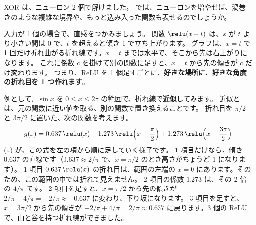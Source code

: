 XOR は、ニューロン 2 個で解けました。
では、ニューロンを増やせば、渦巻きのような複雑な境界や、もっと込み入った関数も表せるのでしょうか。

入力が 1 個の場合で、直感をつかみましょう。
関数 $\relu(x-t)$ は、$x$ が $t$ より小さい間は 0 で、$t$ を超えると傾き 1 で立ち上がります。
グラフは、$x=t$ で 1 回だけ折れ曲がる折れ線です。$x=t$ までは水平で、そこから先は右上がりになります。
これに係数 $c$ を掛けて別の関数に足すと、$x=t$ から先の傾きが $c$ だけ変わります。
つまり、ReLU を 1 個足すごとに、\textbf{好きな場所に、好きな角度の折れ目を 1 つ作れます}。

例として、$\sin x$ を $0\le x\le 2\pi$ の範囲で、折れ線で\textbf{近似}してみます。
近似とは、元の関数に近い値を取る、別の関数で置き換えることです。
折れ目を $\pi/2$ と $3\pi/2$ に置いた、次の関数を考えます。
\begin{equation}
g(x)=0.637\,\relu(x)-1.273\,\relu\Bigl(x-\frac{\pi}{2}\Bigr)+1.273\,\relu\Bigl(x-\frac{3\pi}{2}\Bigr)
\label{eq:nn-relu-sin}
\end{equation}
(a) が、この式を左の項から順に足していく様子です。
1 項目だけなら、傾き $0.637$ の直線です（$0.637\approx 2/\pi$ で、$x=\pi/2$ のとき高さがちょうど 1 になります）。
1 項目 $0.637\,\relu(x)$ の折れ目は、範囲の左端の $x=0$ にあります。そのため、この範囲の中では折れて見えません。
2 項目の係数 $1.273$ は、その 2 倍の $4/\pi$ です。
2 項目を足すと、$x=\pi/2$ から先の傾きが $2/\pi-4/\pi=-2/\pi\approx-0.637$ に変わり、下り坂になります。
3 項目を足すと、$x=3\pi/2$ から先の傾きが $-2/\pi+4/\pi=2/\pi\approx 0.637$ に戻ります。3 個の ReLU で、山と谷を持つ折れ線ができました。

